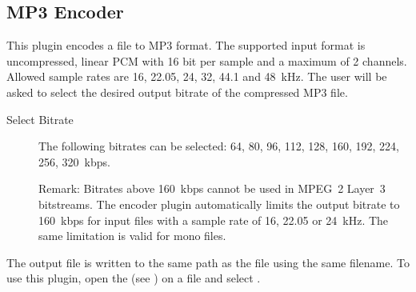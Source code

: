 \subsection{MP3 Encoder}
This plugin encodes a  file to MP3 format. The supported
input format is uncompressed, linear PCM with 16 bit per sample and a maximum
of 2 channels. Allowed sample rates are 16, 22.05, 24, 32, 44.1 and 48~kHz.
The user will be asked to select the desired output bitrate of the compressed
MP3 file. 

\begin{description}
\item[Select Bitrate] The following bitrates can be selected: 64, 80, 96, 112, 
128, 160, 192, 224, 256, 320~kbps.

Remark: Bitrates above 160~kbps cannot be used in MPEG~2 Layer~3 bitstreams. 
The encoder plugin automatically limits the output bitrate to 160~kbps for 
input files with a sample rate of 16, 22.05 or 24~kHz. The same limitation is 
valid for mono files.
\end{description}

The output  file is written to the same path as the  
file using the same filename. To use this plugin, open the  
(see ) on a  file and select 
.

